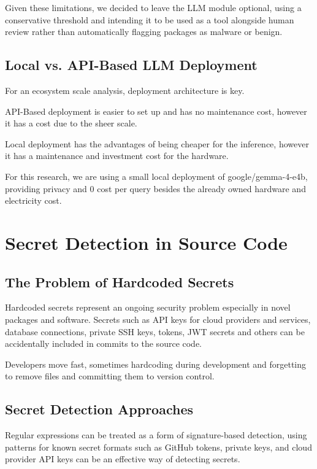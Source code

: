 Given these limitations, we decided to leave the LLM module optional, using a conservative threshold and intending it to be used as a tool alongside human review rather than automatically flagging packages as malware or benign.

\subsection{Local vs. API-Based LLM Deployment}\label{sect:local-vs-api-based-llm-deployment}

For an ecosystem scale analysis, deployment architecture is key.

API-Based deployment is easier to set up and has no maintenance cost, however it has a cost due to the sheer scale.

Local deployment has the advantages of being cheaper for the inference, however it has a maintenance and investment cost for the hardware.

For this research, we are using a small local deployment of google/gemma-4-e4b, providing privacy and 0 cost per query besides the already owned hardware and electricity cost.

\section{Secret Detection in Source Code}\label{sect:secret-detection}

\subsection{The Problem of Hardcoded Secrets}\label{sect:the-problem-of-hardcoded-secrets}

Hardcoded secrets represent an ongoing security problem especially in novel packages and software. Secrets such as API keys for cloud providers and services, database connections, private SSH keys, tokens, JWT secrets and others can be accidentally included in commits to the source code.

Developers move fast, sometimes hardcoding during development and forgetting to remove files and committing them to version control.

\subsection{Secret Detection Approaches}\label{sect:secret-detection-approaches}

Regular expressions can be treated as a form of signature-based detection, using patterns for known secret formats such as GitHub tokens, private keys, and cloud provider API keys can be an effective way of detecting secrets.

